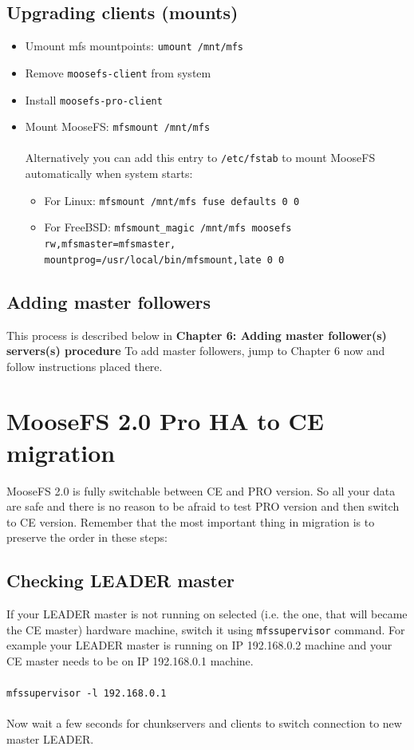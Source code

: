 \documentclass[a4paper,11pt,english]{report}
\def\code#1{\texttt{#1}}
\begin{document}
		\section{Upgrading clients (mounts)}
		\begin{itemize}
			\item Umount mfs mountpoints: \code{umount /mnt/mfs}
			\item Remove \code{moosefs-client} from system
			\item Install \code{moosefs-pro-client}
			\item Mount MooseFS: \code{mfsmount /mnt/mfs} \\\\
			Alternatively you can add this entry to \code{/etc/fstab} to mount MooseFS automatically when system starts: \\
			
			\begin{itemize}
				\item For Linux: \code{mfsmount		/mnt/mfs		fuse	defaults	0	0}
				\item For FreeBSD: \code{mfsmount\_magic  /mnt/mfs        moosefs rw,mfsmaster=mfsmaster,\\mountprog=/usr/local/bin/mfsmount,late    0       0}
			\end{itemize}
		\end{itemize}

		\section{Adding master followers}
		This process is described below in \textbf{Chapter 6: Adding master follower(s) servers(s) procedure}
		To add master followers, jump to Chapter 6 now and follow instructions placed there.
		
	\chapter{MooseFS 2.0 Pro HA to CE migration}
	MooseFS 2.0 is fully switchable between CE and PRO version. So all your data are safe and there is no reason to be afraid to test PRO version and then switch to CE version.
	Remember that the most important thing in migration is to preserve the order in these steps:
	
		\section{Checking LEADER master}
		If your LEADER master is not running on selected (i.e. the one, that will became the CE master) hardware machine, switch it using \code{mfssupervisor} command. For example your LEADER master is running on IP 192.168.0.2 machine and your CE master needs to be on IP 192.168.0.1 machine.\\\\ 
		\code{mfssupervisor -l 192.168.0.1}\\\\
		Now wait a few seconds for chunkservers and clients to switch connection to new master LEADER.
\end{document}
